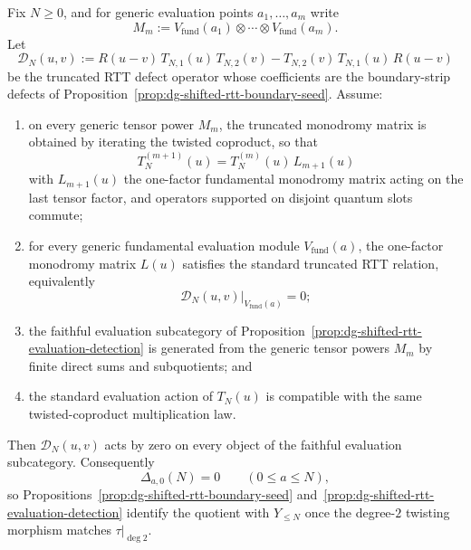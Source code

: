 \begin{proposition}
\label{prop:dg-shifted-rtt-fundamental-propagation}
Fix $N \ge 0$, and for generic evaluation points
$a_1,\dots,a_m$ write
\[
M_m:=V_{\mathrm{fund}}(a_1)\otimes\cdots\otimes V_{\mathrm{fund}}(a_m).
\]
Let
\[
\mathcal{D}_N(u,v):=
R(u-v)\,T_{N,1}(u)\,T_{N,2}(v)
-T_{N,2}(v)\,T_{N,1}(u)\,R(u-v)
\]
be the truncated RTT defect operator whose coefficients are the
boundary-strip defects of
Proposition~\ref{prop:dg-shifted-rtt-boundary-seed}. Assume:
\begin{enumerate}[label=\textup{(\roman*)}]
\item on every generic tensor power $M_m$, the truncated monodromy
 matrix is obtained by iterating the twisted coproduct, so that
 \[
 T_N^{(m+1)}(u)=T_N^{(m)}(u)\,L_{m+1}(u)
 \]
 with $L_{m+1}(u)$ the one-factor fundamental monodromy matrix acting
 on the last tensor factor, and operators supported on disjoint
 quantum slots commute;
\item for every generic fundamental evaluation module
 $V_{\mathrm{fund}}(a)$, the one-factor monodromy matrix $L(u)$
 satisfies the standard truncated RTT relation, equivalently
 \[
 \mathcal{D}_N(u,v)\big|_{V_{\mathrm{fund}}(a)}=0;
 \]
\item the faithful evaluation subcategory of
 Proposition~\ref{prop:dg-shifted-rtt-evaluation-detection} is
 generated from the generic tensor powers $M_m$ by finite direct sums
 and subquotients; and
\item the standard evaluation action of $T_N(u)$ is compatible with the
 same twisted-coproduct multiplication law.
\end{enumerate}
Then $\mathcal{D}_N(u,v)$ acts by zero on every object of the faithful
evaluation subcategory. Consequently
\[
\Delta_{a,0}(N)=0
\qquad (0\le a\le N),
\]
so
Propositions~\ref{prop:dg-shifted-rtt-boundary-seed}
and~\ref{prop:dg-shifted-rtt-evaluation-detection}
identify the quotient with $Y_{\le N}$ once the degree-$2$ twisting
morphism matches $\tau|_{\deg 2}$.
\end{proposition}

